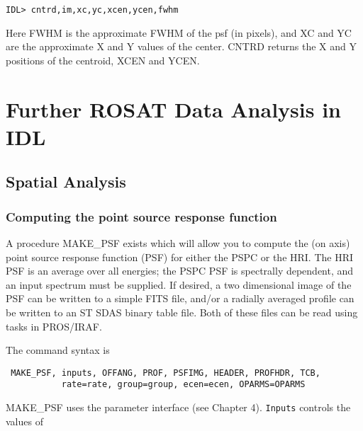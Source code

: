 \medskip\noindent
\begin{verbatim}
IDL> cntrd,im,xc,yc,xcen,ycen,fwhm
\end{verbatim}
Here FWHM is the approximate FWHM of the psf (in pixels), and XC and YC are
the approximate X and Y values of the center. CNTRD returns the X and Y
positions of the centroid, XCEN and YCEN.
 
\chapter{Further ROSAT Data Analysis in IDL }
 

\section{Spatial Analysis}
 

\subsection{Computing the point source response function}
 
A procedure MAKE{\_}PSF exists which will allow you to compute the (on axis) point
source response function (PSF) for either the PSPC or the HRI. The HRI PSF is
an average over all energies; the PSPC PSF is spectrally dependent, and an
input spectrum must be supplied. If desired, a two dimensional image of the PSF
can be written to a simple FITS file, and/or a radially averaged profile can be
written to an ST SDAS binary table file. Both of these files can be read using
tasks in PROS/IRAF.
 
The command syntax is

\medskip\noindent
\begin{verbatim}
 MAKE_PSF, inputs, OFFANG, PROF, PSFIMG, HEADER, PROFHDR, TCB,
           rate=rate, group=group, ecen=ecen, OPARMS=OPARMS
\end{verbatim}
MAKE{\_}PSF uses the parameter interface (see Chapter 4). {\tt Inputs} controls the
values of

